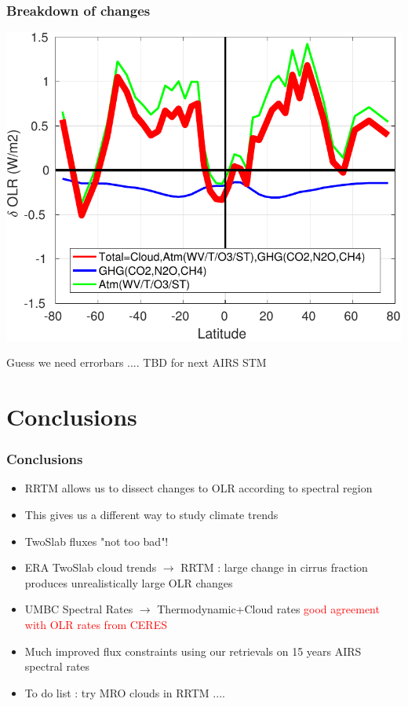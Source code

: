 \documentclass[10pt,t]{beamer}
\begin{document}
\begin{frame}
  \frametitle{Breakdown of changes}
  \begin{center}
    \noindent\includegraphics[width=0.625\linewidth]{Figs/umbc_total_vs_atm_vs_GHG.pdf}
  \end{center}
 Guess we need errorbars .... TBD for next AIRS STM
\end{frame}
\section{Conclusions}
\begin{frame}
  \frametitle{Conclusions}
  \begin{itemize}
  \item RRTM allows us to dissect changes to OLR according to spectral region
  \item This gives us a different way to study climate trends
  \item TwoSlab fluxes "not too bad"!
  \item ERA TwoSlab cloud trends $\rightarrow$ RRTM : large change in cirrus fraction
        produces unrealistically large OLR changes
  \item UMBC Spectral Rates $\rightarrow$ Thermodynamic+Cloud rates \textcolor{red}{good agreement
        with OLR rates from CERES}
  \item Much improved flux constraints using our retrievals on 15 years AIRS spectral rates
  \item To do list : try MRO clouds in RRTM ....
  \end{itemize}
\end{frame}
\end{document}
